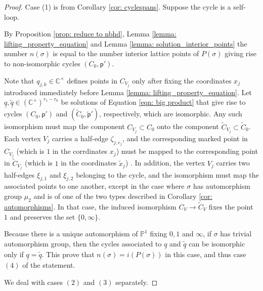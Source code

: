 \documentclass{article}
\def\P{\mathbb{P}}
\begin{document}
    \begin{proof}
        Case (1) is from Corollary \ref{cor: cyclespans}. 
        Suppose the cycle is a self-loop. 
        
        By Proposition \ref{prop: reduce to nbhd}, Lemma \ref{lemma: lifting_property_equation} and Lemma \ref{lemma: solution_interior_points} the number $n(\sigma)$ is equal to the number interior lattice points of $P(\sigma)$ giving rise to non-isomorphic cycles $(C_0,\mathsf{p}')$. 

        Note that $q_{j,k} \in \mathbb{C}^\times$ defines points in $C_{V_j}$ only after fixing the coordinates $x_j$ introduced immediately before Lemma \ref{lemma: lifting_property_equation}. Let $\underline{q}, \widetilde{\underline{q}} \in (\mathbb{C}^\times)^{r_1-r_0}$ be solutions of Equation \eqref{eqn: big product} that give rise to cycles $(C_0,\mathsf{p}')$ and $(\widetilde{C}_0,\widetilde{\mathsf{p}}')$, respectively, which are isomorphic. Any such isomorphism must map the component $C_{V_j} \subset C_0$  onto the component $\widetilde{C}_{V_j} \subset \widetilde{C}_0$. Each vertex $V_j$ carries a half-edge $\zeta_{j,e_j}$, and the corresponding marked point in $C_{V_j}$ (which is $1$ in the corrdinates $x_j$) must be mapped to the corresponding point in $\widetilde{C}_{V_j}$ (which is $1$ in the coordinates $\widetilde{x}_j$) . In addition, the vertex $V_j$ carries two half-edges $\xi_{j,1}$ and $\xi_{j,2}$ belonging to the cycle, and the isomorphism must map the associated points to one another, except in the case where $\sigma$ has automorphism group $\mu_2$ and is of one of the two types described in Corollary \ref{cor: automorphisms}. In that case, the induced isomorphism $C_V \to \widetilde{C}_V$ fixes the point $1$ and preserves the set $\{0,\infty\}$.

        Because there is a unique automorphism of $\P^1$ fixing $0,1$ and $\infty$, if $\sigma$ has trivial automorphism group, then the cycles associated to $\underline{q}$ and $\widetilde{\underline{q}}$ can be isomorphic only if $\underline{q}=\widetilde{\underline{q}} $. This prove that $n(\sigma)=i(P(\sigma))$ in this case, and thus case $(4)$ of the statement.

        We deal with cases $(2)$ and $(3)$ separately. 


\end{proof}
\end{document}
